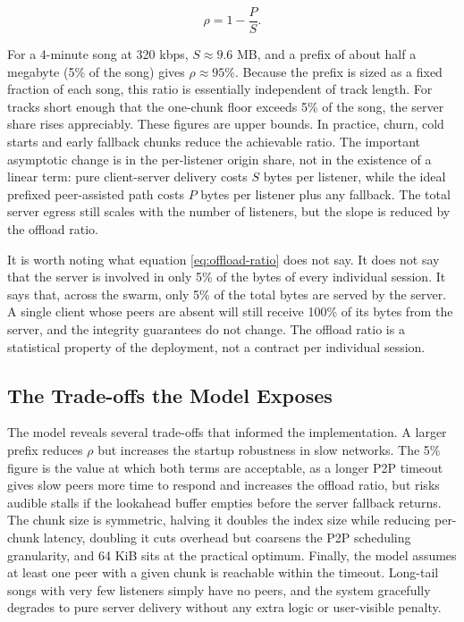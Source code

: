 \begin{equation}
  \rho = 1 - \frac{P}{S}.
  \label{eq:offload-ratio}
\end{equation}

\par For a 4-minute song at 320 kbps, $S \approx 9.6$ MB, and a prefix of about half a megabyte (5\% of the song) gives $\rho \approx 95\%$. Because the prefix is sized as a fixed fraction of each song, this ratio is essentially independent of track length. For tracks short enough that the one-chunk floor exceeds 5\% of the song, the server share rises appreciably. These figures are upper bounds. In practice, churn, cold starts and early fallback chunks reduce the achievable ratio. The important asymptotic change is in the per-listener origin share, not in the existence of a linear term: pure client-server delivery costs $S$ bytes per listener, while the ideal prefixed peer-assisted path costs $P$ bytes per listener plus any fallback. The total server egress still scales with the number of listeners, but the slope is reduced by the offload ratio.

\par It is worth noting what equation \eqref{eq:offload-ratio} does not say. It does not say that the server is involved in only 5\% of the bytes of every individual session. It says that, across the swarm, only 5\% of the total bytes are served by the server. A single client whose peers are absent will still receive 100\% of its bytes from the server, and the integrity guarantees do not change. The offload ratio is a statistical property of the deployment, not a contract per individual session.

\subsection{The Trade-offs the Model Exposes}
\label{subsec:tradeoffs}

\indent \par The model reveals several trade-offs that informed the implementation. A larger prefix reduces $\rho$ but increases the startup robustness in slow networks. The 5\% figure is the value at which both terms are acceptable, as a longer P2P timeout gives slow peers more time to respond and increases the offload ratio, but risks audible stalls if the lookahead buffer empties before the server fallback returns. The chunk size is symmetric, halving it doubles the index size while reducing per-chunk latency, doubling it cuts overhead but coarsens the P2P scheduling granularity, and 64 KiB sits at the practical optimum. Finally, the model assumes at least one peer with a given chunk is reachable within the timeout. Long-tail songs with very few listeners simply have no peers, and the system gracefully degrades to pure server delivery without any extra logic or user-visible penalty.

